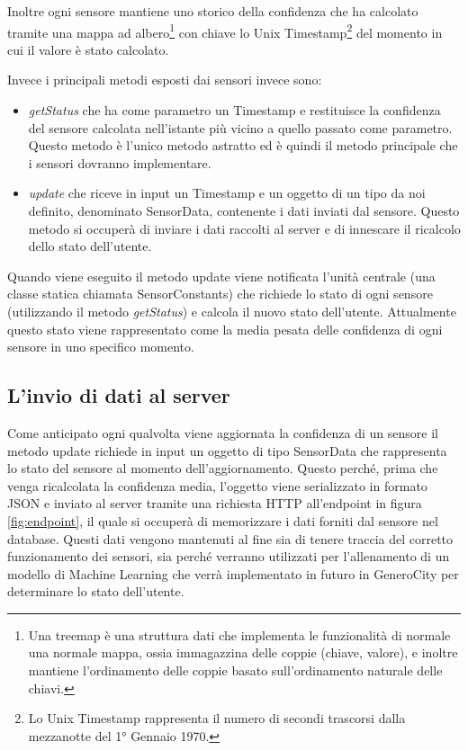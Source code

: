 Inoltre ogni sensore mantiene uno storico della confidenza che ha calcolato tramite una mappa ad albero\footnote{Una treemap è una struttura dati che implementa le funzionalità di normale una normale mappa, ossia immagazzina delle coppie (chiave, valore), e inoltre mantiene l'ordinamento delle coppie basato sull'ordinamento naturale delle chiavi.} con chiave lo Unix Timestamp\footnote{Lo Unix Timestamp rappresenta il numero di secondi trascorsi dalla mezzanotte del 1° Gennaio 1970.} del momento in cui il valore è stato calcolato.

Invece i principali metodi esposti dai sensori invece sono:
\begin{itemize}
    \item \textit{getStatus} che ha come parametro un Timestamp e restituisce la confidenza del sensore calcolata nell'istante più vicino a quello passato come parametro. Questo metodo è l'unico metodo astratto ed è quindi il metodo principale che i sensori dovranno implementare.
    \item \textit{update} che riceve in input un Timestamp e un oggetto di un tipo da noi definito, denominato SensorData, contenente i dati inviati dal sensore. Questo metodo si occuperà di inviare i dati raccolti al server e di innescare il ricalcolo dello stato dell'utente.
\end{itemize}
Quando viene eseguito il metodo update viene notificata l'unità centrale (una classe statica chiamata SensorConstants) che richiede lo stato di ogni sensore (utilizzando il metodo \textit{getStatus}) e calcola il nuovo stato dell'utente. Attualmente questo stato viene rappresentato come la media pesata delle confidenza di ogni sensore in uno specifico momento.

\subsection{L'invio di dati al server}
Come anticipato ogni qualvolta viene aggiornata la confidenza di un sensore il metodo update richiede in input un oggetto di tipo SensorData che rappresenta lo stato del sensore al momento dell'aggiornamento. Questo perché, prima che venga ricalcolata la confidenza media, l'oggetto viene serializzato in formato JSON e inviato al server tramite una richiesta HTTP all'endpoint in figura \ref{fig:endpoint}, il quale si occuperà di memorizzare i dati forniti dal sensore nel database. Questi dati vengono mantenuti al fine sia di tenere traccia del corretto funzionamento dei sensori, sia perché verranno utilizzati per l'allenamento di un modello di Machine Learning che verrà implementato in futuro in GeneroCity per determinare lo stato dell'utente.

